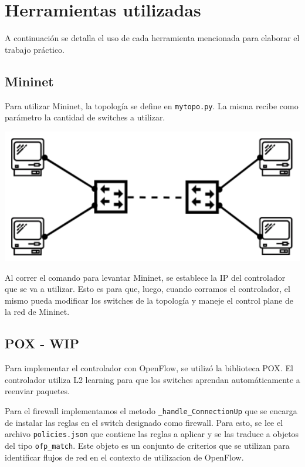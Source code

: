 \documentclass{article}
\begin{document}
\section{Herramientas utilizadas}\label{implementacion-wip}
A continuación se detalla el uso de cada herramienta mencionada para elaborar el trabajo práctico.

\subsection{Mininet}\label{mininet}

Para utilizar Mininet, la topología se define en \texttt{mytopo.py}. La misma recibe como parámetro la cantidad de switches a utilizar.

\begin{center}
\includegraphics[scale=0.35]{mininet_topo.png}
\end{center}

Al correr el comando para levantar Mininet, se establece la IP del controlador que se va a utilizar. Esto es para que, luego, cuando corramos el controlador, el mismo pueda modificar los switches de la topología y maneje el control plane de la red de Mininet.

\subsection{POX - WIP}\label{pox}
Para implementar el controlador con OpenFlow, se utilizó la biblioteca POX. El controlador utiliza L2 learning para que los switches aprendan automáticamente a reenviar paquetes.

Para el firewall implementamos el metodo \texttt{\_handle\_ConnectionUp} que se encarga de instalar las reglas en el switch designado como firewall. Para esto, se lee el archivo \texttt{policies.json} que contiene las reglas a aplicar y se las traduce a objetos del tipo \texttt{ofp\_match}. Este objeto es un conjunto de criterios que se utilizan para identificar flujos de red en el contexto de utilizacion de OpenFlow. 
\end{document}
